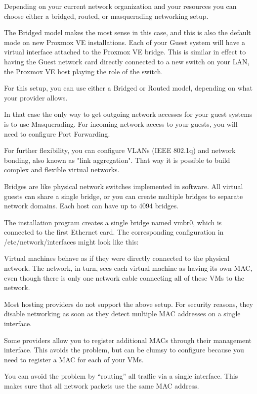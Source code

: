 Depending on your current network organization and your resources you can choose either a bridged, routed, or masquerading networking setup.

The Bridged model makes the most sense in this case, and this is also the default mode on new Proxmox VE installations. Each of your Guest system will have a virtual interface attached to the Proxmox VE bridge. This is similar in effect to having the Guest network card directly connected to a new switch on your LAN, the Proxmox VE host playing the role of the switch.

For this setup, you can use either a Bridged or Routed model, depending on what your provider allows.

In that case the only way to get outgoing network accesses for your guest systems is to use Masquerading. For incoming network access to your guests, you will need to configure Port Forwarding.

For further flexibility, you can configure VLANs (IEEE 802.1q) and network bonding, also known as "link aggregation". That way it is possible to build complex and flexible virtual networks.

Bridges are like physical network switches implemented in software. All virtual guests can share a single bridge, or you can create multiple bridges to separate network domains. Each host can have up to 4094 bridges.

The installation program creates a single bridge named vmbr0, which is connected to the first Ethernet card. The corresponding configuration in /etc/network/interfaces might look like this:

Virtual machines behave as if they were directly connected to the physical network. The network, in turn, sees each virtual machine as having its own MAC, even though there is only one network cable connecting all of these VMs to the network.

Most hosting providers do not support the above setup. For security reasons, they disable networking as soon as they detect multiple MAC addresses on a single interface.

Some providers allow you to register additional MACs through their management interface. This avoids the problem, but can be clumsy to configure because you need to register a MAC for each of your VMs.

You can avoid the problem by “routing” all traffic via a single interface. This makes sure that all network packets use the same MAC address.

